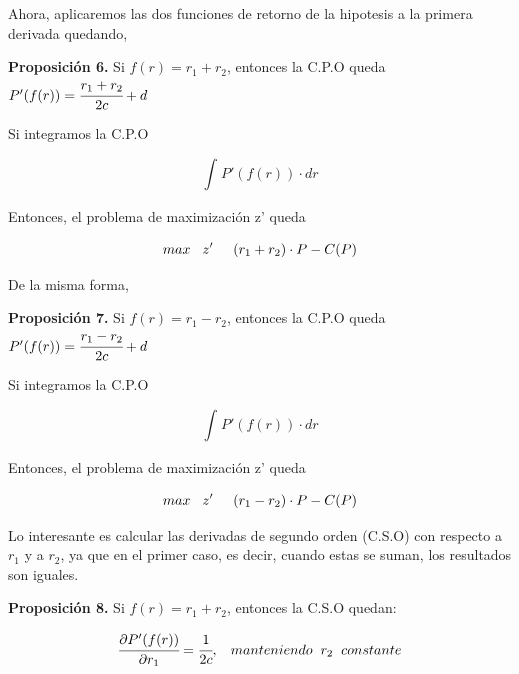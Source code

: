 \documentclass[11pt,letterpaper]{article}
\begin{document}
Ahora, aplicaremos las dos funciones de retorno de la hipotesis a la primera derivada quedando,

\vspace{0,5 cm}
\textbf{Proposición 6.} Si $f(r) = r_1 + r_2$, entonces la  C.P.O queda $P'(f(r)) = \cfrac{r_1 + r_2}{2c} + d$
\vspace{0,5 cm}


Si integramos la C.P.O 

\begin{equation}
    \int_{}{} P'(f(r)) \cdot dr
\end{equation}

Entonces, el problema de maximización z' queda

\begin{equation}
    max \hspace{0,3cm}z' \hspace{0,5cm} (r_1 + r_2)\cdot P - C(P)
\end{equation}

De la misma forma,

\vspace{0,5 cm}
\textbf{Proposición 7.} Si $f(r) = r_1 - r_2$, entonces la  C.P.O queda $P'(f(r)) = \cfrac{r_1 - r_2}{2c} + d$
\vspace{0,5 cm}


Si integramos la C.P.O 

\begin{equation}
    \int_{}{} P'(f(r)) \cdot dr
\end{equation}

Entonces, el problema de maximización z' queda

\begin{equation}
    max \hspace{0,3cm}z' \hspace{0,5cm} (r_1 - r_2)\cdot P - C(P)
\end{equation}

Lo interesante es calcular las derivadas de segundo orden (C.S.O) con respecto a $r_1$ y a $r_2$, ya que en el primer caso, es decir, cuando estas se suman, los resultados son iguales.


\vspace{0,5 cm}
\textbf{Proposición 8.} Si $f(r) = r_1 + r_2$, entonces la  C.S.O quedan:

\begin{equation} 
    \cfrac{\partial P'(f(r))}{\partial r_1} = \cfrac{1}{2c}, \hspace{0,3 cm} manteniendo \hspace{0,2 cm} r_2 \hspace{0,2 cm}constante
\end{equation}
\end{document}
